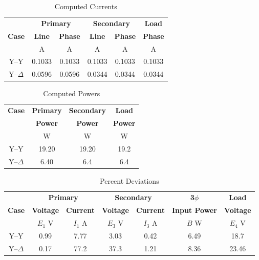 \documentclass{article}
\begin{document}
\begin{table}[H]
  \centering
  \begin{tabular}{*{6}{c}}
    & \multicolumn{2}{c}{\textbf{Primary}}
    & \multicolumn{2}{c}{\textbf{Secondary}} & \textbf{Load} \\

    \textbf{Case} & \textbf{Line} & \textbf{Phase} & \textbf{Line} &
    \textbf{Phase} & \textbf{Phase} \\

    & A & A & A & A & A \\
    \hline

    Y--Y        & 0.1033 & 0.1033 & 0.1033 & 0.1033 & 0.1033 \\
    Y--$\Delta$ & 0.0596 & 0.0596 & 0.0344 & 0.0344 & 0.0344 \\
  \end{tabular}
  \caption{Computed Currents}
  \label{tab:curr_comp}
\end{table}

\begin{table}[H]
  \centering
  \begin{tabular}{*{4}{c}}
    \textbf{Case} & \textbf{Primary} & \textbf{Secondary} & \textbf{Load} \\

    & \textbf{Power} & \textbf{Power} & \textbf{Power} \\

    & W & W & W \\
    \hline

    Y--Y        & 19.20 & 19.20 & 19.2 \\
    Y--$\Delta$ & 6.40 & 6.4 & 6.4 \\
  \end{tabular}
  \caption{Computed Powers}
  \label{tab:pow_comp}
\end{table}

\begin{table}[H]
  \centering
  \begin{tabular}{*{7}{c}}
    & \multicolumn{2}{c}{\textbf{Primary}} &
    \multicolumn{2}{c}{\textbf{Secondary}} & \textbf{3$\phi$} & \textbf{Load} \\

    \textbf{Case} & \textbf{Voltage} & \textbf{Current} & \textbf{Voltage} &
    \textbf{Current} & \textbf{Input Power} & \textbf{Voltage} \\

    & $E_1$ V & $I_1$ A & $E_3$ V & $I_3$ A & $B$ W & $E_4$ V \\

    \hline
    Y--Y        & 0.99 & 7.77 & 3.03 & 0.42 & 6.49 & 18.7 \\
    Y--$\Delta$ & 0.17 & 77.2 & 37.3 & 1.21 & 8.36 & 23.46 \\
  \end{tabular}
  \caption{Percent Deviations}
  \label{tab:results}
\end{table}
\end{document}
